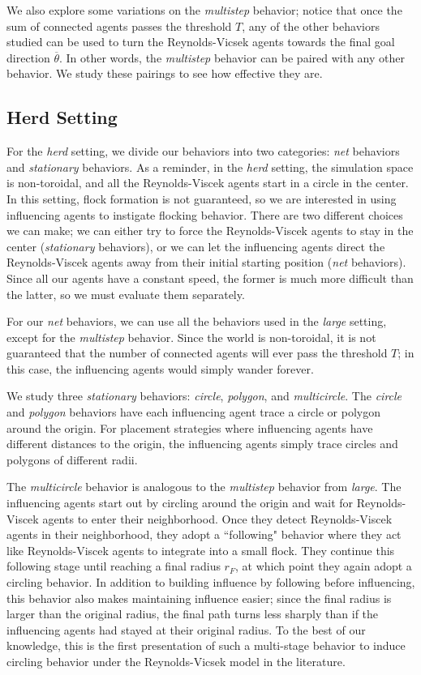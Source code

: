 We also explore some variations on the \textit{multistep} behavior; notice that
once the sum of connected agents passes the threshold $T$, any of the other
behaviors studied can be used to turn the Reynolds-Vicsek agents towards the
final goal direction $\overline{\theta}$.
In other words, the \textit{multistep} behavior can be paired with any other
behavior.
We study these pairings to see how effective they are.

\subsection{Herd Setting}
For the \textit{herd} setting, we divide our behaviors into two categories:
\textit{net} behaviors and \textit{stationary} behaviors.
As a reminder, in the \textit{herd} setting, the simulation space is
non-toroidal, and all the Reynolds-Viscek agents start in a circle in the
center.
In this setting, flock formation is not guaranteed, so we are interested in
using influencing agents to instigate flocking behavior.
There are two different choices we can make; we can either try to force the
Reynolds-Viscek agents to stay in the center (\textit{stationary} behaviors),
or we can let the influencing agents direct the Reynolds-Viscek agents away
from their initial starting position (\textit{net} behaviors).
Since all our agents have a constant speed, the former is much more difficult
than the latter, so we must evaluate them separately.

For our \textit{net} behaviors, we can use all the behaviors used in the
\textit{large} setting, except for the \textit{multistep} behavior.
Since the world is non-toroidal, it is not guaranteed that the number of
connected agents will ever pass the threshold $T$; in this case, the
influencing agents would simply wander forever.

We study three \textit{stationary} behaviors: \textit{circle}, \textit{polygon},
and \textit{multicircle}.
The \textit{circle} and \textit{polygon} behaviors have each influencing agent
trace a circle or polygon around the origin.
For placement strategies where influencing agents have different distances to
the origin, the influencing agents simply trace circles and polygons of
different radii.

The \textit{multicircle} behavior is analogous to the \textit{multistep}
behavior from \textit{large}.
The influencing agents start out by circling around the origin and wait for
Reynolds-Viscek agents to enter their neighborhood.
Once they detect Reynolds-Viscek agents in their neighborhood, they adopt a
``following" behavior where they act like Reynolds-Viscek agents to integrate
into a small flock.
They continue this following stage until reaching a final radius $r_F$, at which
point they again adopt a circling behavior.
In addition to building influence by following before influencing, this behavior
also makes maintaining influence easier; since the final radius is larger than
the original radius, the final path turns less sharply than if the influencing
agents had stayed at their original radius.
To the best of our knowledge, this is the first presentation of such a
multi-stage behavior to induce circling behavior under the Reynolds-Vicsek
model in the literature.

